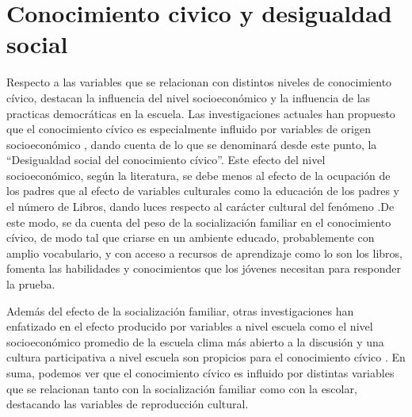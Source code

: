 \documentclass[12pt,twoside]{templates/facsothesis}
\begin{document}
\hypertarget{conocimiento-civico-y-desigualdad-social}{%
\section{Conocimiento civico y desigualdad social}\label{conocimiento-civico-y-desigualdad-social}}

Respecto a las variables que se relacionan con distintos niveles de conocimiento cívico, destacan la influencia del nivel socioeconómico y la influencia de las practicas democráticas en la escuela. Las investigaciones actuales han propuesto que el conocimiento cívico es especialmente influido por variables de origen socioeconómico \citep{aceEstudioInternacionalEducacion2017, schulzEstudioInternacionalSobre2011, ferransCivicCompetenceGaps2017, trevinoInfluenceTeachersSchools2017}, dando cuenta de lo que se denominará desde este punto, la ``Desigualdad social del conocimiento cívico''. Este efecto del nivel socioeconómico, según la literatura, se debe menos al efecto de la ocupación de los padres que al efecto de variables culturales como la educación de los padres y el número de Libros, dando luces respecto al carácter cultural del fenómeno \citep{castilloSocialInequalityChanges2014}.De este modo, se da cuenta del peso de la socialización familiar en el conocimiento cívico, de modo tal que criarse en un ambiente educado, probablemente con amplio vocabulario, y con acceso a recursos de aprendizaje como lo son los libros, fomenta las habilidades y conocimientos que los jóvenes necesitan para responder la prueba.

Además del efecto de la socialización familiar, otras investigaciones han enfatizado en el efecto producido por variables a nivel escuela como el nivel socioeconómico promedio de la escuela clima más abierto a la discusión y una cultura participativa a nivel escuela son propicios para el conocimiento cívico \citep{informeiccs2011}. En suma, podemos ver que el conocimiento cívico es influido por distintas variables que se relacionan tanto con la socialización familiar como con la escolar, destacando las variables de reproducción cultural.
\end{document}
